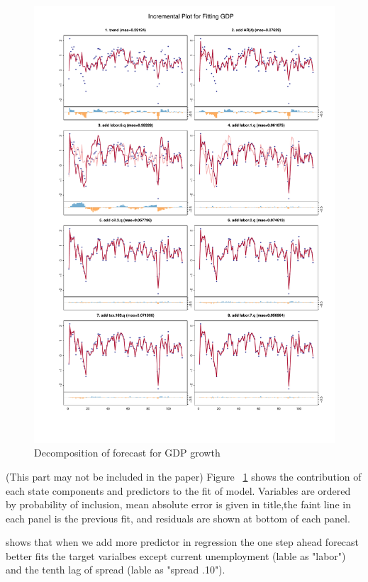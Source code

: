 \begin{figure}[p]
	\centering
	\includegraphics[width=1\linewidth]{Figures/GDPincremental}
	\caption{Decomposition of forecast for GDP growth}
	\label{fig:GDPincremental}
\end{figure}

(This part may not be included in the paper)
Figure ~\ref{fig:GDPincremental} shows the contribution of each state components and predictors to the fit of model. Variables
are ordered by probability of inclusion, mean absolute error is given in title,the faint line in each panel is the previous fit, and residuals are shown at bottom of each panel. 

shows that when we add more predictor in regression the one step ahead forecast better fits the target varialbes except current unemployment (lable as "labor") and the tenth lag of spread (lable as "spread .10").


